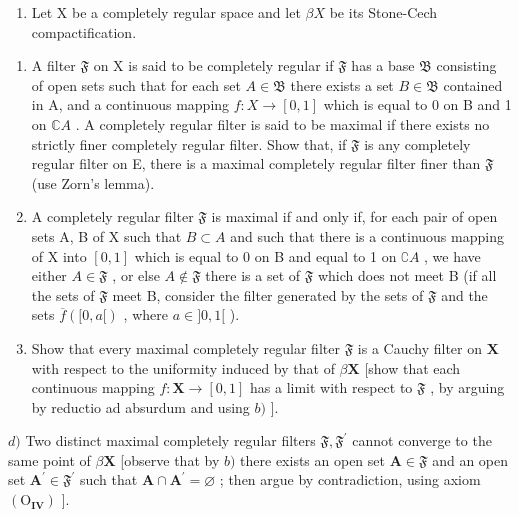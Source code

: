 \begin{enumerate}
\def\labelenumi{\arabic{enumi})}
\setcounter{enumi}{7}
\tightlist
\item
  Let X be a completely regular space and let \(\beta X\) be its Stone-Cech compactification.
\end{enumerate}

\begin{enumerate}
\def\labelenumi{\alph{enumi})}
\item
  A filter \(\mathfrak{F}\) on X is said to be completely regular if \(\mathfrak{F}\) has a base \(\mathfrak{B}\) consisting of open sets such that for each set \(A \in \mathfrak{B}\) there exists a set \(B \in \mathfrak{B}\) contained in A, and a continuous mapping \(f: X \to [0, 1]\) which is equal to 0 on B and 1 on \(\mathbb{C}A\) . A completely regular filter is said to be maximal if there exists no strictly finer completely regular filter. Show that, if \(\mathfrak{F}\) is any completely regular filter on E, there is a maximal completely regular filter finer than \(\mathfrak{F}\) (use Zorn's lemma).
\item
  A completely regular filter \(\mathfrak{F}\) is maximal if and only if, for each pair of open sets A, B of X such that \(B \subset A\) and such that there is a continuous mapping of X into \([0, 1]\) which is equal to 0 on B and equal to 1 on \(\complement A\) , we have either \(A \in \mathfrak{F}\) , or else \(A \notin \mathfrak{F}\) there is a set of \(\mathfrak{F}\) which does not meet B (if all the sets of \(\mathfrak{F}\) meet B, consider the filter generated by the sets of \(\mathfrak{F}\) and the sets \(\overline{f}([0, a[)\) , where \(a \in ]0, 1[\) ).
\item
  Show that every maximal completely regular filter \(\mathfrak{F}\) is a Cauchy filter on \(\mathbf{X}\) with respect to the uniformity induced by that of \(\beta\mathbf{X}\) {[}show that each continuous mapping \(f: \mathbf{X} \to [\mathrm{0}, \mathrm{1}]\) has a limit with respect to \(\mathfrak{F}\) , by arguing by reductio ad absurdum and using \(b)\) {]}.
\end{enumerate}

\(d)\) Two distinct maximal completely regular filters \(\mathfrak{F},\mathfrak{F}^{\prime}\) cannot converge to the same point of \(\beta\mathbf{X}\) {[}observe that by \(b)\) there exists an open set \(\mathbf{A}\in\mathfrak{F}\) and an open set \(\mathbf{A}^{\prime}\in\mathfrak{F}^{\prime}\) such that \(\mathbf{A}\cap\mathbf{A}^{\prime}=\varnothing\) ; then argue by contradiction, using axiom \((\mathrm{O}_{\mathbf{IV}})\) {]}.

